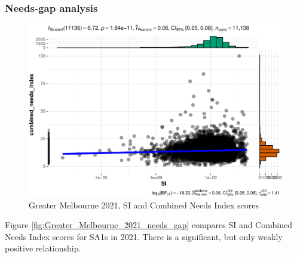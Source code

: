 \documentclass[preprint, 3p,
authoryear]{elsarticle} %
\begin{document}
\subsubsection{Needs-gap analysis}\label{needs-gap-analysis}

\begin{figure}
\centering
\includegraphics{Leveraging_GTFS_to_assess_transit_supply_Transport_Geography_files/figure-latex/Greater_Melbourne_2021_needs_gap-1.pdf}
\caption{Greater Melbourne 2021, SI and Combined Needs Index scores}
\end{figure}

Figure \ref{fig:Greater_Melbourne_2021_needs_gap} compares SI and
Combined Needs Index scores for SA1s in 2021. There is a significant,
but only weakly positive relationship.
\end{document}
